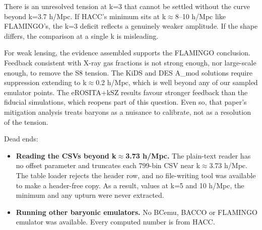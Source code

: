 \documentclass[11pt,a4paper]{article}
\begin{document}
There is an unresolved tension at k=3 that cannot be settled without the curve beyond k=3.7 h/Mpc. If HACC's minimum sits at k$\approx$8--10 h/Mpc like FLAMINGO's, the k=3 deficit reflects a genuinely weaker amplitude. If the shape differs, the comparison at a single k is misleading.

For weak lensing, the evidence assembled supports the FLAMINGO conclusion. Feedback consistent with X-ray gas fractions is not strong enough, nor large-scale enough, to remove the S8 tension. The KiDS and DES A\_mod solutions require suppression extending to k$\approx$0.2 h/Mpc, which is well beyond any of our sampled emulator points. The eROSITA+kSZ results favour stronger feedback than the fiducial simulations, which reopens part of this question. Even so, that paper's mitigation analysis treats baryons as a nuisance to calibrate, not as a resolution of the tension.

Dead ends:

\begin{itemize}
  \item \textbf{Reading the CSVs beyond k$\approx$3.73 h/Mpc.} The plain-text reader has no offset parameter and truncates each 799-bin CSV near k$\approx$3.73 h/Mpc. The table loader rejects the header row, and no file-writing tool was available to make a header-free copy. As a result, values at k=5 and 10 h/Mpc, the minimum and any upturn were never extracted.
  \item \textbf{Running other baryonic emulators.} No BCemu, BACCO or FLAMINGO emulator was available. Every computed number is from HACC.
\end{itemize}
\end{document}
